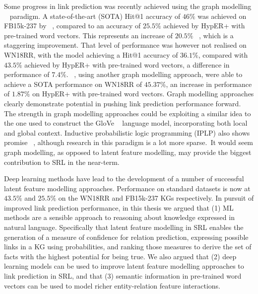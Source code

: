 \noindent Some progress in link prediction was recently achieved using the graph modelling \unskip ~\citep{Nickel_2016} paradigm. A state-of-the-art (SOTA) Hit@1 accuracy of $ 46\% $ was achieved on FB15k-237 by \unskip ~\citep{nathani2019learning}, compared to an accuracy of $ 25.5\% $ achieved by HypER+ with pre-trained word vectors. This represents an increase of $ 20.5 \% $ \unskip ~\citep{ruderNLPProg}, which is a staggering improvement. That level of performance was however not realised on WN18RR, with the model achieving a Hit@1 accuracy of $ 36.1\% $, compared with $ 43.5 \% $ achieved by HypER+ with pre-trained word vectors, a difference in performance of $ 7.4\% $. \unskip ~\citep{pinter-eisenstein-2018-predicting}, using another graph modelling approach, were able to achieve a SOTA performance on WN18RR of $ 45.37\% $, an increase in performance of $ 1.87\% $ on HypER+ with pre-trained word vectors. Graph modelling approaches clearly demonstrate potential in pushing link prediction performance forward. The strength in graph modelling approaches could be exploiting a similar idea to the one used to construct the GloVe \unskip ~\citep{pennington2014glove} language model, incorporating both local and global context. Inductive probabilistic logic programming (IPLP) also shows promise \unskip ~\citep{dong2019neural, manhaeve2018deepproblog}, although research in this paradigm is a lot more sparse.\ It would seem graph modelling, as opposed to latent feature modelling, may provide the biggest contribution to SRL in the near-term. \par

\noindent Deep learning methods have lead to the development of a number of successful latent feature modelling approaches. Performance on standard datasets is now at $ 43.5\% $ and $ 25.5\% $ on the WN18RR and FB15k-237 KGs respectively. In pursuit of improved link prediction performance, in this thesis we argued that (1) ML methods are a sensible approach to reasoning about knowledge expressed in natural language. Specifically that latent feature modelling in SRL enables the generation of a measure of confidence for relation prediction, expressing possible links in a KG using probabilities, and ranking those measures to derive the set of facts with the highest potential for being true. We also argued that (2) deep learning models can be used to improve latent feature modelling approaches to link prediction in SRL, and that (3) semantic information in pre-trained word vectors can be used to model richer entity-relation feature interactions. \par

